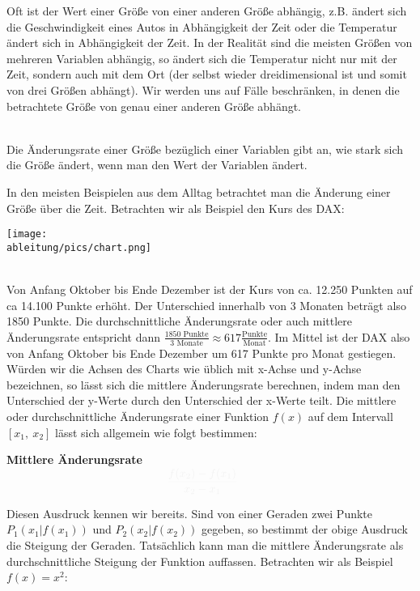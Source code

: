 Oft ist der Wert einer Größe von einer anderen Größe abhängig, z.B. ändert sich die Geschwindigkeit eines Autos in Abhängigkeit der Zeit oder die Temperatur ändert sich in Abhängigkeit der Zeit. In der Realität sind die meisten Größen von mehreren Variablen abhängig, so ändert sich die Temperatur nicht nur mit der Zeit, sondern auch mit dem Ort (der selbst wieder dreidimensional ist und somit von drei Größen abhängt). Wir werden uns auf Fälle beschränken, in denen die betrachtete Größe von genau einer anderen Größe abhängt.
\begin{tcolorbox}
	\phantom{ }\\
	\textcolor{loestc}{Die Änderungsrate einer Größe bezüglich einer Variablen gibt an, wie stark sich die Größe ändert, wenn man den Wert der Variablen ändert.}\\
\end{tcolorbox}
In den meisten Beispielen aus dem Alltag betrachtet man die Änderung einer Größe über die Zeit. Betrachten wir als Beispiel den Kurs des DAX:\\
\begin{minipage}[t]{\textwidth}
	\centering\texttt{[image: \\ableitung/pics/chart.png]}
\end{minipage}\\
Von Anfang Oktober bis Ende Dezember ist der Kurs von ca. 12.250 Punkten auf ca 14.100 Punkte erhöht. Der Unterschied innerhalb von 3 Monaten beträgt also 1850 Punkte. Die durchschnittliche Änderungsrate oder auch mittlere Änderungsrate entspricht dann \(\frac{1850\text{ Punkte}}{3\text{ Monate}}\approx 617\frac{\text{Punkte}}{\text{Monat}}\). Im Mittel ist der DAX also von Anfang Oktober bis Ende Dezember um 617 Punkte pro Monat gestiegen. Würden wir die Achsen des Charts wie üblich mit x-Achse und y-Achse bezeichnen, so lässt sich die mittlere Änderungsrate berechnen, indem man den Unterschied der y-Werte durch den Unterschied der x-Werte teilt.\newpage
Die mittlere oder durchschnittliche Änderungsrate einer Funktion \(f(x)\) auf dem Intervall \([x_1,\ x_2]\) lässt sich allgemein wie folgt bestimmen:
\begin{tcolorbox}
	\textbf{Mittlere Änderungsrate}\\
	\Large$\makebox[\linewidth]{\textcolor{loestc}{\(\dfrac{f(x_2)-f(x_1)}{x_2-x_1}\)}}$
\end{tcolorbox}
Diesen Ausdruck kennen wir bereits. Sind von einer Geraden zwei Punkte \(P_1(x_1|f(x_1))\) und \(P_2(x_2|f(x_2))\) gegeben, so bestimmt der obige Ausdruck die Steigung der Geraden. Tatsächlich kann man die mittlere Änderungsrate als durchschnittliche Steigung der Funktion auffassen. Betrachten wir als Beispiel \(f(x)=x^2\):\\
